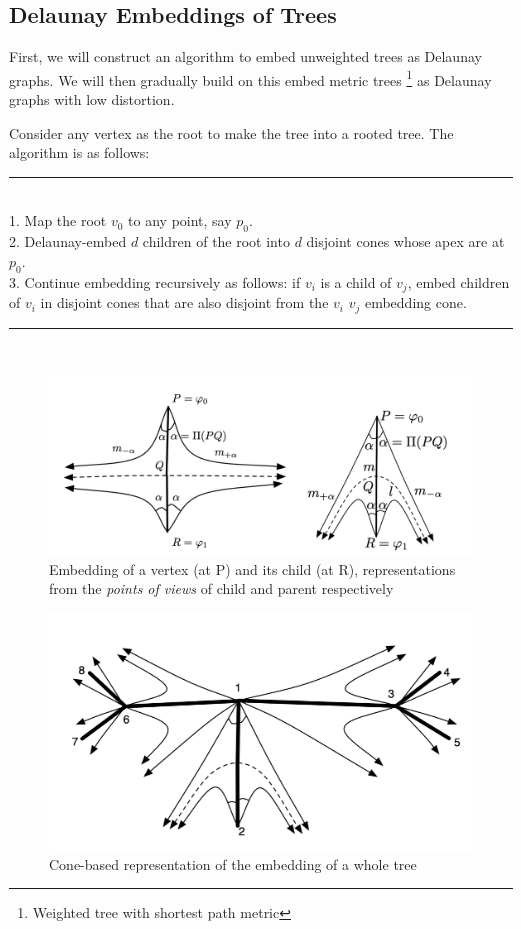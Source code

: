 \subsection{Delaunay Embeddings of Trees}
First, we will construct an algorithm to embed unweighted trees as Delaunay graphs. We will then gradually build on this embed metric trees \footnote{Weighted tree with shortest path metric} as Delaunay graphs with low distortion.

Consider any vertex as the root to make the tree into a rooted tree. The algorithm is as follows: \\
\rule{\linewidth}{0.5pt} \\
1. Map the root $v_0$ to any point, say $p_0$. \\
2. Delaunay-embed $d$ children of the root into $d$ disjoint cones whose apex are at $p_0$. \\
3. Continue embedding recursively as follows: if $v_i$ is a child of $v_j$, embed children of $v_i$ in disjoint cones that are also disjoint from the $v_i$ $v_j$ embedding cone.  \\
\rule{\linewidth}{0.5pt} \\

\begin{figure}
    \centering
    \includegraphics[width=\textwidth]{chapter_16/files/cone2.png}
    \caption{Embedding of a vertex (at P) and its child (at R), representations from the \textit{points of views} of child and parent respectively}
    \label{fig:cone_two}
\end{figure}

\begin{figure}
    \centering
    \includegraphics[width=\textwidth]{chapter_16/files/conem.png}
    \caption{Cone-based representation of the embedding of a whole tree}
    \label{fig:cone_multiple}
\end{figure}


